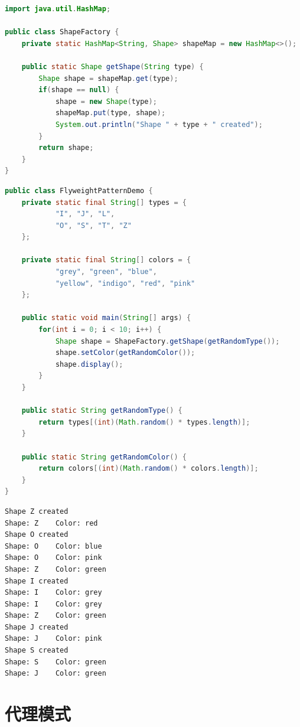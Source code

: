 \begin{lstlisting}[language=Java, title=ShapeFactory.java]
import java.util.HashMap;

public class ShapeFactory {
    private static HashMap<String, Shape> shapeMap = new HashMap<>();

    public static Shape getShape(String type) {
        Shape shape = shapeMap.get(type);
        if(shape == null) {
            shape = new Shape(type);
            shapeMap.put(type, shape);
            System.out.println("Shape " + type + " created");
        }
        return shape;
    }
}
\end{lstlisting}

\begin{lstlisting}[language=Java, title=FlyweightPatternDemo.java]
public class FlyweightPatternDemo {
    private static final String[] types = {
            "I", "J", "L",
            "O", "S", "T", "Z"
    };

    private static final String[] colors = {
            "grey", "green", "blue",
            "yellow", "indigo", "red", "pink"
    };

    public static void main(String[] args) {
        for(int i = 0; i < 10; i++) {
            Shape shape = ShapeFactory.getShape(getRandomType());
            shape.setColor(getRandomColor());
            shape.display();
        }
    }

    public static String getRandomType() {
        return types[(int)(Math.random() * types.length)];
    }

    public static String getRandomColor() {
        return colors[(int)(Math.random() * colors.length)];
    }
}
\end{lstlisting}

\begin{tcolorbox}
    \begin{verbatim}
Shape Z created
Shape: Z	Color: red
Shape O created
Shape: O	Color: blue
Shape: O	Color: pink
Shape: Z	Color: green
Shape I created
Shape: I	Color: grey
Shape: I	Color: grey
Shape: Z	Color: green
Shape J created
Shape: J	Color: pink
Shape S created
Shape: S	Color: green
Shape: J	Color: green
\end{verbatim}
\end{tcolorbox}

\newpage

\section{代理模式}

